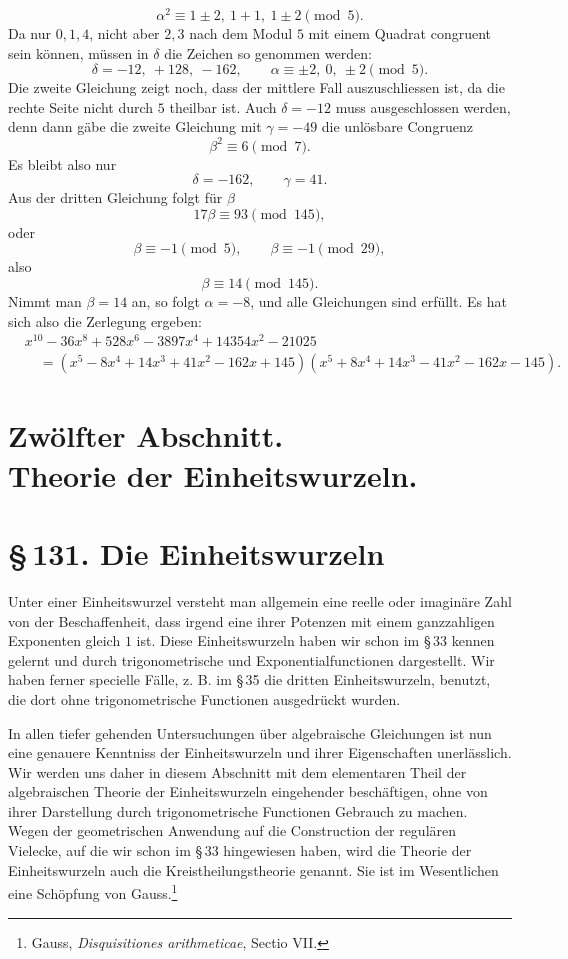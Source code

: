 \documentclass[11pt]{article}
\providecommand{\sect}[2]{\section*{\S\,#1. #2}}
\begin{document}
\[
        \alpha^2\equiv1\pm2,\ 1+1,\ 1\pm2\pmod5.
\]
Da nur $0,1,4$, nicht aber $2,3$ nach dem Modul $5$ mit einem Quadrat congruent sein können, müssen in $\delta$ die Zeichen so genommen werden:
\[
        \delta=-12,\ +128,\ -162,
        \qquad
        \alpha\equiv\pm2,\ 0,\ \pm2\pmod5.
\]
Die zweite Gleichung zeigt noch, dass der mittlere Fall auszuschliessen ist, da die rechte Seite nicht durch $5$ theilbar ist. Auch $\delta=-12$ muss ausgeschlossen werden, denn dann gäbe die zweite Gleichung mit $\gamma=-49$ die unlösbare Congruenz
\[
        \beta^2\equiv6\pmod7.
\]
Es bleibt also nur
\[
        \delta=-162,\qquad \gamma=41.
\]
Aus der dritten Gleichung folgt für $\beta$
\[
        17\beta\equiv93\pmod{145},
\]
oder
\[
        \beta\equiv -1\pmod5,\qquad \beta\equiv -1\pmod{29},
\]
also
\[
        \beta\equiv14\pmod{145}.
\]
Nimmt man $\beta=14$ an, so folgt $\alpha=-8$, und alle Gleichungen sind erfüllt. Es hat sich also die Zerlegung ergeben:
\[
\begin{aligned}
&x^{10}-36x^8+528x^6-3897x^4+14354x^2-21025\\
&\quad=(x^5-8x^4+14x^3+41x^2-162x+145)
       (x^5+8x^4+14x^3-41x^2-162x-145).
\end{aligned}
\]

\section*{Zwölfter Abschnitt.\\Theorie der Einheitswurzeln.}

\sect{131}{Die Einheitswurzeln}

Unter einer Einheitswurzel versteht man allgemein eine reelle oder imaginäre Zahl von der Beschaffenheit, dass irgend eine ihrer Potenzen mit einem ganzzahligen Exponenten gleich $1$ ist. Diese Einheitswurzeln haben wir schon im \S\,33 kennen gelernt und durch trigonometrische und Exponentialfunctionen dargestellt. Wir haben ferner specielle Fälle, z. B. im \S\,35 die dritten Einheitswurzeln, benutzt, die dort ohne trigonometrische Functionen ausgedrückt wurden.

In allen tiefer gehenden Untersuchungen über algebraische Gleichungen ist nun eine genauere Kenntniss der Einheitswurzeln und ihrer Eigenschaften unerlässlich. Wir werden uns daher in diesem Abschnitt mit dem elementaren Theil der algebraischen Theorie der Einheitswurzeln eingehender beschäftigen, ohne von ihrer Darstellung durch trigonometrische Functionen Gebrauch zu machen. Wegen der geometrischen Anwendung auf die Construction der regulären Vielecke, auf die wir schon im \S\,33 hingewiesen haben, wird die Theorie der Einheitswurzeln auch die Kreistheilungstheorie genannt. Sie ist im Wesentlichen eine Schöpfung von Gauss.\footnote{Gauss, \emph{Disquisitiones arithmeticae}, Sectio VII.}
\end{document}
